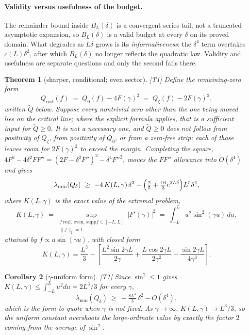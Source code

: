 \documentclass[11pt,a4paper]{article}
\newtheorem{theorem}{Theorem}
\newtheorem{corollary}[theorem]{Corollary}
\theoremstyle{definition}
\theoremstyle{remark}
\newcommand{\tier}[1]{{\small\textsf{[#1]}}}
\newcommand{\lmin}{\lambda_{\min}}
\begin{document}
\paragraph{Validity versus usefulness of the budget.} The remainder bound inside
$B_L(\delta)$ is a convergent series tail, not a truncated asymptotic expansion, so
$B_L(\delta)$ is a valid budget at every $\delta$ on its proved domain. What degrades as
$L\delta$ grows is its \emph{informativeness}: the $\delta^{4}$ term overtakes
$c(L)\delta^{2}$, after which $B_L(\delta)$ no longer reflects the quadratic law. Validity and
usefulness are separate questions and only the second fails there.

\begin{theorem}[sharper, conditional; even sector]\label{thm:zetasharp}\tier{T1}
Define the \emph{remaining-zero form}
\[
Q_{\mathrm{rest}}(f)\;=\;Q_0(f)-4F(\gamma)^{2}\;=\;Q_\zeta(f)-2F(\gamma)^{2},
\]
written $\widetilde Q$ below. Suppose every nontrivial zero other than the one being moved lies
on the critical line; where the explicit formula applies, that is a sufficient input for
$\widetilde Q\ge0$. It is not a necessary one, and $\widetilde Q\ge0$ does \emph{not} follow
from positivity of $Q_\zeta$, from positivity of $Q_0$, or from a zero-free strip: each of
those leaves room for $2F(\gamma)^{2}$ to exceed the margin. Completing the square,
$4F^{2}-4\delta^{2}FF''=(2F-\delta^{2}F'')^{2}-\delta^{4}F''^{2}$, moves the $FF''$
allowance into $O(\delta^{4})$ and gives
\[
\lmin(Q_\delta)\ \ge\ -4\,K(L,\gamma)\,\delta^{2}
-\Bigl(\tfrac25+\tfrac{16}{3}e^{2L\delta}\Bigr)L^{5}\delta^{4},
\]
where $K(L,\gamma)$ is the \emph{exact} value of the extremal problem,
\begin{equation}\label{eq:K}
K(L,\gamma)\;=\!\!\sup_{\substack{f\ \mathrm{real,\ even},\ \mathrm{supp}f\subset[-L,L]\\ \|f\|_2=1}}\!\!|F'(\gamma)|^{2}
\;=\;\int_{-L}^{L}\!u^{2}\sin^{2}(\gamma u)\,du,
\end{equation}
attained by $f\propto u\sin(\gamma u)$, with closed form
\[
K(L,\gamma)=\frac{L^{3}}{3}-\left[\frac{L^{2}\sin 2\gamma L}{2\gamma}
+\frac{L\cos 2\gamma L}{2\gamma^{2}}-\frac{\sin 2\gamma L}{4\gamma^{3}}\right].
\]
\end{theorem}

\begin{corollary}[$\gamma$-uniform form]\label{cor:uniform}\tier{T1}
Since $\sin^{2}\le1$ gives $K(L,\gamma)\le\int_{-L}^{L}u^{2}du=2L^{3}/3$ for every $\gamma$,
\[
\lmin(Q_\delta)\ \ge\ -\tfrac{8L^{3}}{3}\,\delta^{2}-O(\delta^{4}),
\]
which is the form to quote when $\gamma$ is not fixed. As $\gamma\to\infty$,
$K(L,\gamma)\to L^{3}/3$, so the uniform constant overshoots the large-ordinate value by
exactly the factor $2$ coming from the average of $\sin^{2}$.
\end{corollary}
\end{document}

